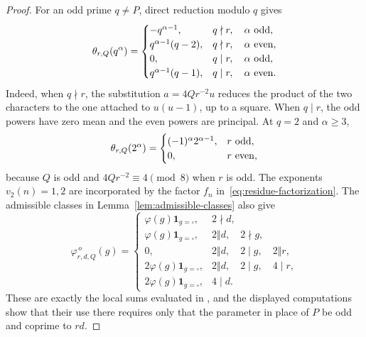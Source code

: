 \documentclass[12pt,reqno]{amsart}
\numberwithin{equation}{section}
\theoremstyle{plain}
\theoremstyle{definition}
\theoremstyle{remark}
\begin{document}
\begin{proof}
For an odd prime $q\neq P$, direct reduction modulo $q$ gives
\[
\theta_{r,Q}(q^\alpha)
=
\begin{cases}
-q^{\alpha-1},&q\nmid r,\quad \alpha\ {\rm odd},\\
q^{\alpha-1}(q-2),&q\nmid r,\quad \alpha\ {\rm even},\\
0,&q\mid r,\quad \alpha\ {\rm odd},\\
q^{\alpha-1}(q-1),&q\mid r,\quad \alpha\ {\rm even}.
\end{cases}
\]
Indeed, when $q\nmid r$, the substitution $a=4Qr^{-2}u$ reduces the product of the two characters to the one attached to $u(u-1)$, up to a square.
When $q\mid r$, the odd powers have zero mean and the even powers are principal.
At $q=2$ and $\alpha\geq3$,
\[
\theta_{r,Q}(2^\alpha)
=
\begin{cases}
(-1)^\alpha2^{\alpha-1},&r\ {\rm odd},\\
0,&r\ {\rm even},
\end{cases}
\]
because $Q$ is odd and $4Qr^{-2}\equiv4\pmod8$ when $r$ is odd.
The exponents $v_2(n)=1,2$ are incorporated by the factor $f_n$ in~\eqref{eq:residue-factorization}.
The admissible classes in Lemma~\ref{lem:admissible-classes} also give
\[
\varphi^{\,o}_{r,d,Q}(g)
=
\begin{cases}
\varphi(g)\mathbf1_{g=\square},&2\nmid d,\\
\varphi(g)\mathbf1_{g=\square},&2\Vert d,\quad 2\nmid g,\\
0,&2\Vert d,\quad 2\mid g,\quad 2\Vert r,\\
2\varphi(g)\mathbf1_{g=\square},
 &2\Vert d,\quad 2\mid g,\quad 4\mid r,\\
2\varphi(g)\mathbf1_{g=\square},&4\mid d.
\end{cases}
\]
These are exactly the local sums evaluated in
\cite[Lemmas~3.8 and~3.9]{Zubrilina2025}, and the displayed computations show that their use there requires only that the parameter in place of $P$ be odd and coprime to $rd$.


\end{proof}
\end{document}
